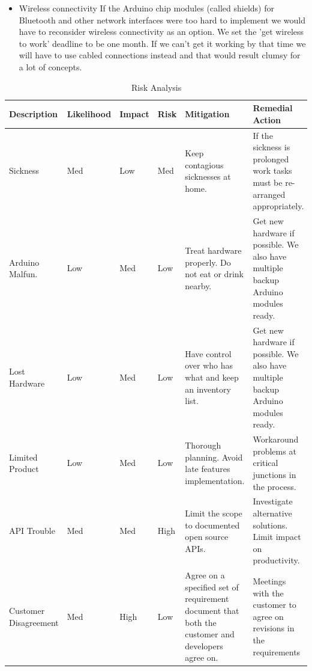\begin{itemize}
\item{Wireless connectivity}\newline
If the Arduino chip modules (called shields) for Bluetooth and other network interfaces were too
hard to implement we would have to reconsider wireless connectivity as an option.
We set the 'get wireless to work' deadline to be one month. If we can't get it working
by that time we will have to use cabled connections instead and that would result clumsy
for a lot of concepts.
\end{itemize}

\begin{table}
	\begin{center}
		\caption{Risk Analysis}
		\begin{tabular}{| l | l | l | l | p{2.8cm} | p{3cm} |}
		\hline

\textbf{Description} & \textbf{Likelihood} & \textbf{Impact} & \textbf{Risk} & \textbf{Mitigation} & \textbf{Remedial Action}\\ \hline

Sickness 			& Med & Low & Med & Keep contagious sicknesses at home.
					& If the sickness is prolonged work tasks must be re-arranged appropriately. \\ \hline


Arduino Malfun.		& Low & Med & Low & Treat hardware properly. Do not eat or drink nearby.
					&  Get new hardware if possible. We also have multiple backup Arduino modules ready. \\ \hline

Lost Hardware		& Low & Med & Low & Have control over who has what and keep an inventory list.
					& Get new hardware if possible. We also have multiple backup Arduino modules ready. \\ \hline

Limited Product		& Low & Med & Low & Thorough planning. Avoid late features implementation.
					&  Workaround problems at critical junctions in the process.\\ \hline

API Trouble			& Med & Med & High & Limit the scope to documented open source APIs.
					& Investigate alternative solutions. Limit impact on productivity. \\ \hline

Customer Disagreement	& Med & High & Low & Agree on a specified set of requirement document that both the customer and developers agree on.
					& Meetings with the customer to agree on revisions in the requirements \\ \hline


\end{tabular}
\end{center}
\end{table}
